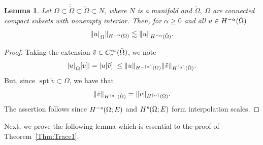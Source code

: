 \documentclass[a4paper,10pt,reqno]{amsart}
\newcommand{\rest}[1]{{{\lvert_{}}_{}}_{#1}}
\newcommand{\interior}[1]{\mathring{#1}}
\newcommand{\modulus}[1]{|#1|}
\newcommand{\norm}[1]{\| #1 \|}%
\newcommand{\Ck}[2][{}]{{\rm C}^{#2}_{\rm #1}}%
\newcommand{\Hard}[2][{}]{{\rm H}^{#2}_{\rm #1}}%
\newcommand{\SobH}[2][{}]{\Hard[#1]{\rm #2}}
\newcommand{\ceil}[1]{\lceil #1 \rceil}%
\DeclareMathOperator{\spt}{spt}%
\newtheorem{lemma}[theorem]{Lemma}
\theoremstyle{definition}
\begin{document}
\begin{lemma}
\label{Lem:NegSobIneq}
Let $\Omega \subset \interior{\tilde{\Omega}} \subset\tilde{\Omega}\subset  N$, where $N$ is a manifold and $\tilde{\Omega},\ \Omega$ are connected compact subsets with nonempty interior.
Then, for $\alpha \geq 0$ and  all $u \in \SobH{-\alpha}(\tilde{\Omega})$
$$ \norm{ u\rest{\Omega}}_{\SobH{-\alpha}(\Omega)} \lesssim  \norm{ u }_{\SobH{-\alpha}(\tilde{\Omega})}.$$
\end{lemma}
\begin{proof}
Taking the extension $\tilde{v} \in \Ck[c]{\infty}(\tilde{\Omega})$, we note
$$
\modulus{u\rest{\Omega}[v]}= \modulus{u[\tilde{v}]} \leq \norm{u}_{\SobH{-\ceil{\alpha}}(\Omega)} \norm{\tilde{v}}_{\SobH{\ceil{\alpha}}(\tilde{\Omega})}.$$
But, since $\spt \tilde{v} \subset \Omega$, we have that
$$\norm{\tilde{v}}_{\SobH{\ceil{\alpha}}(\tilde{\Omega})} =\norm{v}_{\SobH{\ceil{\alpha}}({\Omega})}.$$
The assertion follows since $\SobH{-s}(\Omega;E)$ and $\SobH{s}(\Omega;E)$ form interpolation scales.
\end{proof}

Next, we prove the following lemma which is essential to the proof of Theorem~\ref{Thm:Trace1}.
\end{document}

